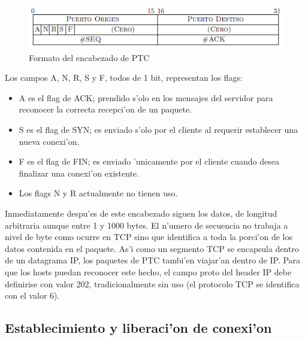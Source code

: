 \begin{figure}[H]
\begin{center}
\includegraphics[width=\textwidth,keepaspectratio]{formatosegmento.png}
\end{center}
\caption{Formato del encabezado de PTC} \label{figura1}
\end{figure}

Los campos A, N, R, S y F, todos de 1 bit, representan los flags:

\begin{itemize}
	\item A es el flag de ACK; prendido s'olo en los mensajes del servidor para reconocer la correcta recepci'on de un paquete.
	\item S es el flag de SYN; es enviado s'olo por el cliente al requerir establecer una nueva conexi'on.
	\item F es el flag de FIN; es enviado 'unicamente por el cliente cuando desea finalizar una conexi'on existente.
	\item Los flags N y R actualmente no tienen uso.
\end{itemize}	

Inmediatamente despu'es de este encabezado siguen los datos, de longitud arbitraria aunque entre 1 y 1000 bytes. El n'umero de secuencia no trabaja a nivel de byte como ocurre en TCP sino que identifica a toda la porci'on de los datos contenida en el paquete. As'i como un segmento TCP se encapsula dentro de un datagrama IP, los paquetes de PTC tambi'en viajar'an dentro de IP. Para que los hosts puedan reconocer este hecho, el campo proto del header IP debe definirise
con valor 202, tradicionalmente sin uso (el protocolo TCP se identifica con el valor 6). 

\subsection {Establecimiento y liberaci'on de conexi'on}


